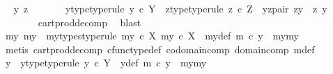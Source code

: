 \begin{isabellebody}
\ \isamarkupfalse%
\ y\ z\ \isanewline
\ \ \ \ \ \ y{\isacharunderscore}{\kern0pt}type{\isacharbrackleft}{\kern0pt}type{\isacharunderscore}{\kern0pt}rule{\isacharbrackright}{\kern0pt}{\isacharcolon}{\kern0pt}\ {\isachardoublequoteopen}y\ {\isasymin}\isactrlsub c\ Y{\isachardoublequoteclose}\ \ z{\isacharunderscore}{\kern0pt}type{\isacharbrackleft}{\kern0pt}type{\isacharunderscore}{\kern0pt}rule{\isacharbrackright}{\kern0pt}{\isacharcolon}{\kern0pt}\ {\isachardoublequoteopen}z\ {\isasymin}\isactrlsub c\ Z{\isachardoublequoteclose}\ \ yz{\isacharunderscore}{\kern0pt}pair{\isacharcolon}{\kern0pt}\ {\isachardoublequoteopen}zy\ {\isacharequal}{\kern0pt}\ {\isasymlangle}z{\isacharcomma}{\kern0pt}\ y{\isasymrangle}{\isachardoublequoteclose}\isanewline
\ \ \ \ \ \ \isamarkupfalse%
\ cart{\isacharunderscore}{\kern0pt}prod{\isacharunderscore}{\kern0pt}decomp\ \isamarkupfalse%
\ blast\isanewline
\ \ \ \ \isamarkupfalse%
\ \isamarkupfalse%
\ my{}\ my{}\ \ my{\isacharunderscore}{\kern0pt}types{\isacharbrackleft}{\kern0pt}type{\isacharunderscore}{\kern0pt}rule{\isacharbrackright}{\kern0pt}{\isacharcolon}{\kern0pt}\ {\isachardoublequoteopen}my{}\ {\isasymin}\isactrlsub c\ X{\isachardoublequoteclose}\ {\isachardoublequoteopen}my{}\ {\isasymin}\isactrlsub c\ X{\isachardoublequoteclose}\ \ my{\isacharunderscore}{\kern0pt}def{\isacharcolon}{\kern0pt}\ {\isachardoublequoteopen}m\ {\isasymcirc}\isactrlsub c\ y\ {\isacharequal}{\kern0pt}\ {\isasymlangle}my{}{\isacharcomma}{\kern0pt}my{}{\isasymrangle}{\isachardoublequoteclose}\isanewline
\ \ \ \ \ \ \isamarkupfalse%
\ {\isacharparenleft}{\kern0pt}metis\ cart{\isacharunderscore}{\kern0pt}prod{\isacharunderscore}{\kern0pt}decomp\ cfunc{\isacharunderscore}{\kern0pt}type{\isacharunderscore}{\kern0pt}def\ codomain{\isacharunderscore}{\kern0pt}comp\ domain{\isacharunderscore}{\kern0pt}comp\ m{\isacharunderscore}{\kern0pt}def{\isacharparenleft}{\kern0pt}{}{\isacharparenright}{\kern0pt}{\isacharparenright}{\kern0pt}\isanewline
\ \ \ \ \isamarkupfalse%
\ \isamarkupfalse%
\ y{\isacharprime}{\kern0pt}\ \ y{\isacharprime}{\kern0pt}{\isacharunderscore}{\kern0pt}type{\isacharbrackleft}{\kern0pt}type{\isacharunderscore}{\kern0pt}rule{\isacharbrackright}{\kern0pt}{\isacharcolon}{\kern0pt}\ {\isachardoublequoteopen}y{\isacharprime}{\kern0pt}\ {\isasymin}\isactrlsub c\ Y{\isachardoublequoteclose}\ \ y{\isacharprime}{\kern0pt}{\isacharunderscore}{\kern0pt}def{\isacharcolon}{\kern0pt}\ {\isachardoublequoteopen}m\ {\isasymcirc}\isactrlsub c\ y{\isacharprime}{\kern0pt}\ {\isacharequal}{\kern0pt}\ {\isasymlangle}my{}{\isacharcomma}{\kern0pt}my{}{\isasymrangle}{\isachardoublequoteclose}\isanewline

\end{isabellebody}
